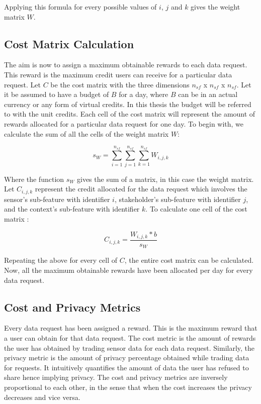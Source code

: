 Applying this formula for every possible values of $i$, $j$ and $k$ gives the weight matrix $W$.

\subsection{Cost Matrix Calculation}

The aim is now to assign a maximum obtainable rewards to each data request. This reward is the maximum credit users can receive for a particular data request. Let $C$ be the cost matrix with the three dimensions $n_{sf}$ x $n_{sf}$ x $n_{sf}$.
Let it be assumed to have a budget of $B$ for a day, where
$B$ can be in an actual currency or any form of virtual credits. In this thesis the budget will be referred to with the unit credits. Each cell of the cost matrix will represent the amount of rewards allocated for a particular data request for one day.
To begin with, we calculate the sum of all the cells of the weight matrix $W$:

\begin{equation}
s_{W} = \sum\limits_{i=1}^{n_{sf}} \sum\limits_{j=1}^{n_{sf}} \sum\limits_{k=1}^{n_{sf}} W_{i,j,k}
\end{equation}

Where the function $s_{W}$ gives the sum of a matrix, in this case the weight matrix.
Let $C_{i,j,k}$ represent the credit allocated for the data request which involves the sensor's sub-feature with identifier $i$, stakeholder's sub-feature with identifier $j$, and the context's sub-feature with identifier $k$. To calculate one cell of the cost matrix :

\begin{equation}
C_{i,j,k} = \frac{W_{i,j,k} * b}{s_{W}}
\end{equation}

Repeating the above for every cell of $C$, the entire cost matrix can be calculated. Now, all the maximum obtainable rewards have been allocated per day for every data request.

\subsection{Cost and Privacy Metrics} \label{o}
Every data request has been assigned a reward. This is the maximum reward that a user can obtain for that data request.
The cost metric is the amount of rewards the user has obtained by trading sensor data for each data request. Similarly, the privacy metric is the amount of privacy percentage obtained while trading data for requests. It intuitively quantifies the amount of data the user has refused to share hence implying privacy. The cost and privacy metrics are inversely proportional to each other, in the sense that when the cost increases the privacy decreases and vice versa.

